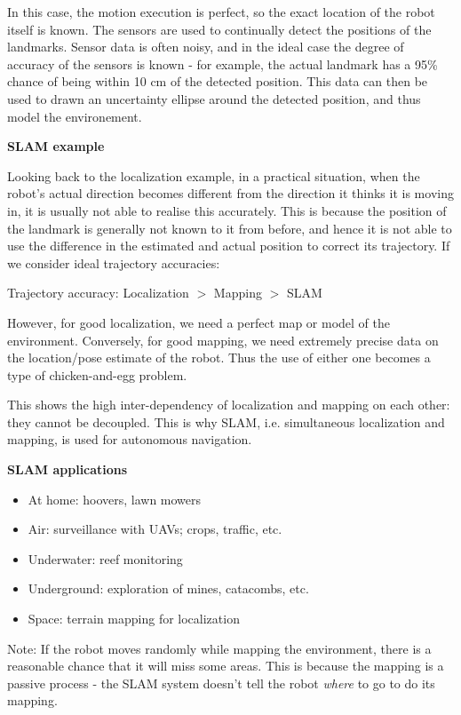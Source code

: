 \documentclass[a4paper]{article}
\begin{document}
In this case, the motion execution is perfect, so the exact location of the robot itself is known. The sensors are used to continually detect the positions of the landmarks. Sensor data is often noisy, and in the ideal case the degree of accuracy of the sensors is known - for example, the actual landmark has a 95\% chance of being within 10 cm of the detected position. This data can then be used to drawn an uncertainty ellipse around the detected position, and thus model the environement.

\textbf{SLAM example}

Looking back to the localization example, in a practical situation, when the robot's actual direction becomes different from the direction it thinks it is moving in, it is usually not able to realise this accurately. This is because the position of the landmark is generally not known to it from before, and hence it is not able to use the difference in the estimated and actual position to correct its trajectory. If we consider ideal trajectory accuracies:

Trajectory accuracy: Localization $>$ Mapping $>$ SLAM

However, for good localization, we need a perfect map or model of the environment. Conversely, for good mapping, we need extremely precise data on the location/pose estimate of the robot. Thus the use of either one becomes a type of chicken-and-egg problem.

This shows the high inter-dependency of localization and mapping on each other: they cannot be decoupled. This is why SLAM, i.e. simultaneous localization and mapping, is used for autonomous navigation.

\textbf{SLAM applications}

\begin{itemize}
    \item At home: hoovers, lawn mowers
    \item Air: surveillance with UAVs; crops, traffic, etc.
    \item Underwater: reef monitoring
    \item Underground: exploration of mines, catacombs, etc.
    \item Space: terrain mapping for localization
\end{itemize}

Note: If the robot moves randomly while mapping the environment, there is a reasonable chance that it will miss some areas. This is because the mapping is a passive process - the SLAM system doesn't tell the robot \emph{where} to go to do its mapping.
\end{document}
